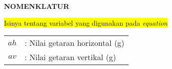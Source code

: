 \begin{center}
	\Large\textbf{NOMENKLATUR}
\end{center}
\vspace{1ex}

\colorbox{yellow}{Isinya tentang variabel yang digunakan pada \textit{equation}}

\begin{tabular}{c m{30em}}
	$ah$	& : Nilai getaran horizontal (g)\\
	$av$	& : Nilai getaran vertikal (g) \\
	
	
\end{tabular}
\newpage